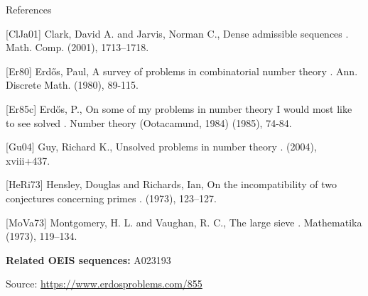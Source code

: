 \documentclass{article}
\begin{document}
References

[ClJa01] Clark, David A. and Jarvis, Norman C., Dense admissible sequences . Math. Comp. (2001), 1713--1718.

[Er80] Erd\H{o}s, Paul, A survey of problems in combinatorial number theory . Ann. Discrete Math. (1980), 89-115.

[Er85c] Erd\H{o}s, P., On some of my problems in number theory I would most like to see solved . Number theory (Ootacamund, 1984) (1985), 74-84.

[Gu04] Guy, Richard K., Unsolved problems in number theory . (2004), xviii+437.

[HeRi73] Hensley, Douglas and Richards, Ian, On the incompatibility of two conjectures concerning primes . (1973), 123--127.

[MoVa73] Montgomery, H. L. and Vaughan, R. C., The large sieve . Mathematika (1973), 119--134.

\noindent\textbf{Related OEIS sequences:} A023193


\bigskip
\noindent\small{Source: \url{https://www.erdosproblems.com/855}}
\end{document}
